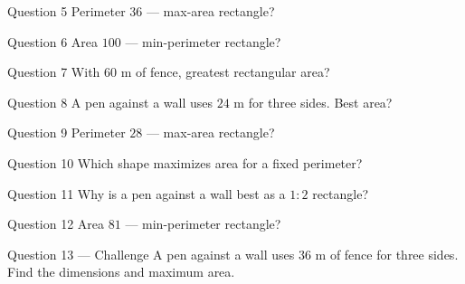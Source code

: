 \documentclass[11pt]{article}
\begin{document}
\begin{qbox}{Question 5}
Perimeter $36$ — max-area rectangle?\workspace{2.4cm}
\end{qbox}

\begin{qbox}{Question 6}
Area $100$ — min-perimeter rectangle?\workspace{2.4cm}
\end{qbox}

\begin{qbox}{Question 7}
With $60$ m of fence, greatest rectangular area?\workspace{2.4cm}
\end{qbox}

\begin{qbox}{Question 8}
A pen against a wall uses $24$ m for three sides. Best area?\workspace{2.4cm}
\end{qbox}

\begin{qbox}{Question 9}
Perimeter $28$ — max-area rectangle?\workspace{2.4cm}
\end{qbox}

\begin{qbox}{Question 10}
Which shape maximizes area for a fixed perimeter?\workspace{2.4cm}
\end{qbox}

\begin{qbox}{Question 11}
Why is a pen against a wall best as a $1{:}2$ rectangle?\workspace{2.4cm}
\end{qbox}

\begin{qbox}{Question 12}
Area $81$ — min-perimeter rectangle?\workspace{2.4cm}
\end{qbox}

\begin{qbox}{Question 13 --- Challenge}
A pen against a wall uses $36$ m of fence for three sides. Find the dimensions and maximum area.\workspace{3cm}
\end{qbox}

\clearpage
{}
\end{document}
